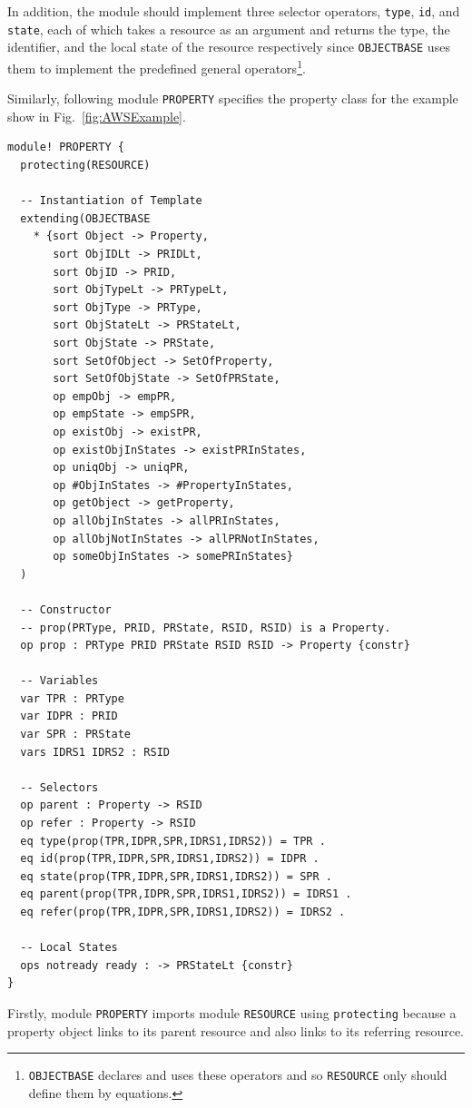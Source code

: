 \documentclass[12pt]{report}
\begin{document}
In addition, the module should implement three selector operators,
{\tt type}, {\tt id}, and {\tt state}, each of which takes a resource
as an argument and returns the type, the identifier, and the local
state of the resource respectively since {\tt OBJECTBASE} uses them to
implement the predefined general operators\footnote{{\tt OBJECTBASE}
  declares and uses these operators and so {\tt RESOURCE} only should
  define them by equations.}.

Similarly, following module {\tt PROPERTY} specifies the property class 
for the example show in Fig.~\ref{fig:AWSExample}.
\begin{verbatim}
module! PROPERTY {
  protecting(RESOURCE)

  -- Instantiation of Template
  extending(OBJECTBASE
    * {sort Object -> Property,
       sort ObjIDLt -> PRIDLt,
       sort ObjID -> PRID,
       sort ObjTypeLt -> PRTypeLt,
       sort ObjType -> PRType,
       sort ObjStateLt -> PRStateLt,
       sort ObjState -> PRState,
       sort SetOfObject -> SetOfProperty,
       sort SetOfObjState -> SetOfPRState,
       op empObj -> empPR,
       op empState -> empSPR,
       op existObj -> existPR,
       op existObjInStates -> existPRInStates,
       op uniqObj -> uniqPR,
       op #ObjInStates -> #PropertyInStates,
       op getObject -> getProperty,
       op allObjInStates -> allPRInStates,
       op allObjNotInStates -> allPRNotInStates,
       op someObjInStates -> somePRInStates}
  )

  -- Constructor
  -- prop(PRType, PRID, PRState, RSID, RSID) is a Property.
  op prop : PRType PRID PRState RSID RSID -> Property {constr}

  -- Variables
  var TPR : PRType
  var IDPR : PRID
  var SPR : PRState
  vars IDRS1 IDRS2 : RSID

  -- Selectors
  op parent : Property -> RSID
  op refer : Property -> RSID
  eq type(prop(TPR,IDPR,SPR,IDRS1,IDRS2)) = TPR .
  eq id(prop(TPR,IDPR,SPR,IDRS1,IDRS2)) = IDPR .
  eq state(prop(TPR,IDPR,SPR,IDRS1,IDRS2)) = SPR .
  eq parent(prop(TPR,IDPR,SPR,IDRS1,IDRS2)) = IDRS1 .
  eq refer(prop(TPR,IDPR,SPR,IDRS1,IDRS2)) = IDRS2 .

  -- Local States
  ops notready ready : -> PRStateLt {constr}
}
\end{verbatim}
Firstly, module {\tt PROPERTY} imports module {\tt RESOURCE} using
{\tt protecting} because a property object links to its parent
resource and also links to its referring resource.
\end{document}
